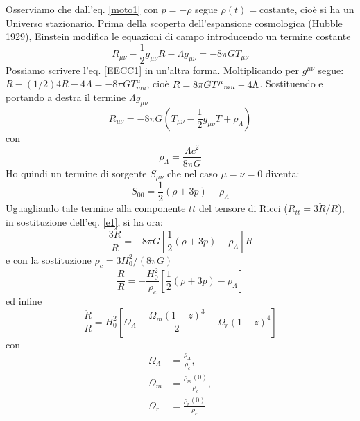 Osserviamo che dall'eq. \eqref{moto1} con $p=-\rho$ segue
$\rho(t)=\text{costante}$, cioè si ha un Universo stazionario.  Prima della
scoperta dell'espansione cosmologica (Hubble 1929), Einstein modifica le
equazioni di campo introducendo un termine costante
\begin{equation}
  R_{\mu \nu} - \frac{1}{2} g_{\mu \nu} R - \Lambda g_{\mu \nu} =
  - 8 \pi G T_{\mu \nu}
  \label{EECC1}
\end{equation}
Possiamo scrivere l'eq. \eqref{EECC1} in un'altra forma.  Moltiplicando per
$g^{\mu \nu}$ segue: $R - (1/2) 4 R - 4\Lambda = -8 \pi G T^{\mu}_{mu}$, cioè
$R=8 \pi G \tensor{T}{^{\mu}}{_{mu}} -4 \Lambda$.  Sostituendo e portando a
destra il termine $\Lambda g_{\mu \nu}$
\begin{equation}
  R_{\mu \nu} = - 8 \pi G
  \left(
    T_{\mu \nu} - \frac {1}{2} g_{\mu \nu} T + \rho_{\Lambda}
  \right)
  \label{EECC2}
\end{equation}
con
\begin{equation}
  \rho_{\Lambda} = \frac {\Lambda c^2} {8 \pi G}
\end{equation}
Ho quindi un termine di sorgente $S_{\mu \nu}$ che nel caso $\mu=\nu=0$ diventa:
\begin{equation}
  S_{00} = \frac {1}{2} (\rho+3p) - \rho_{\Lambda}
\end{equation}
Uguagliando tale termine alla componente $tt$ del tensore di Ricci
($R_{tt}= 3 \ddot{R}/R$), in sostituzione dell'eq. \eqref{e1}, si ha ora:
\begin{equation}
  \frac{3 \ddot{R}}{R} = - 8\pi G \left[ \frac{1}{2}  (\rho+3p) - \rho_{\Lambda} \right] R
\end{equation}
e con la sostituzione $\rho_c=3H_0^2/(8\pi G)$
\begin{equation}
  \frac {\ddot{R}} {R} = - \frac {H_0^2} {\rho_c}
  \left[
    \frac {1}{2}  (\rho+3p) - \rho_{\Lambda}
  \right]
  \label{ecc1}
\end{equation}
ed infine
\begin{equation}
  \label{ddRcc}
  \frac {\ddot{R}} {R} = H_0^2
  \left[
    \Omega_{\Lambda} -\frac {\Omega_m (1+z)^3} {2 }  - \Omega_r (1+z)^4
  \right]
\end{equation}
con
\begin{subequations}
  \begin{align}
    \Omega_{\Lambda} & = \frac{\rho_{\Lambda}}{\rho_c}, \\
    \Omega_m         & = \frac{\rho_m(0)}{\rho_c}, \\
    \Omega_r         & = \frac{\rho_r(0)}{\rho_c}
  \end{align}
\end{subequations}
